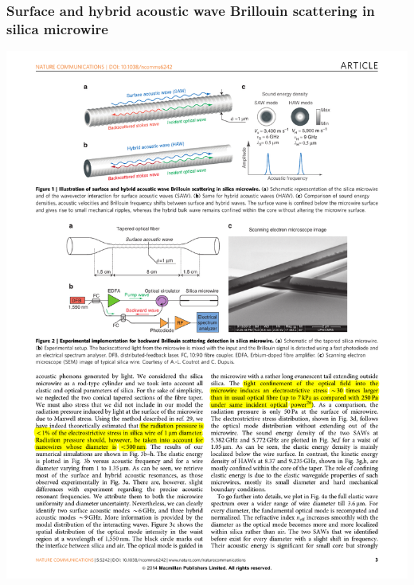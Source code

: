 \documentclass{beamer}
\begin{document}
\begin{frame}
\frametitle{Surface and hybrid acoustic wave Brillouin scattering in silica microwire}
\begin{center}
\includegraphics[width=1.0\columnwidth]{f1.pdf}
\end{center}
\end{frame}

\end{document}
